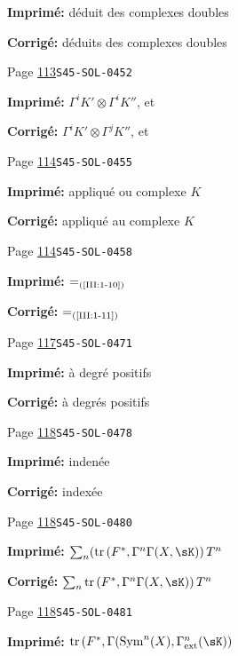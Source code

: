 \documentclass[oneside]{book}
\DeclareMathOperator{\tr}{tr}
\theoremstyle{sga-source}
\theoremstyle{sga-source-dash}
\theoremstyle{sga-source-dotdash}
\theoremstyle{sga-source-number-note-dash}
\theoremstyle{sga-source-note-number-dotdash}
\theoremstyle{sga-source-example-dotdash}
\theoremstyle{sga-source-inline-number}
\theoremstyle{sga-source-bare-number}
\theoremstyle{sga-source}
\begin{document}
\begin{description}
\par\noindent\textbf{Imprimé:} déduit des complexes doubles
\par\noindent\textbf{Corrigé:} déduits des complexes doubles
\smallskip
\item[\hypertarget{apparatus:FR-0070}{70}] Page \hyperlink{printpage:fr:113}{113}\quad\texttt{S45-SOL-0452}
\par\noindent\textbf{Imprimé:} $\Gamma^i K'\otimes \Gamma^i K''$, et
\par\noindent\textbf{Corrigé:} $\Gamma^i K'\otimes \Gamma^j K''$, et
\smallskip
\item[\hypertarget{apparatus:FR-0071}{71}] Page \hyperlink{printpage:fr:114}{114}\quad\texttt{S45-SOL-0455}
\par\noindent\textbf{Imprimé:} appliqué ou complexe $K$
\par\noindent\textbf{Corrigé:} appliqué au complexe $K$
\smallskip
\item[\hypertarget{apparatus:FR-0072}{72}] Page \hyperlink{printpage:fr:114}{114}\quad\texttt{S45-SOL-0458}
\par\noindent\textbf{Imprimé:} \(=_{\text{(\ref{III:1-10})}}\)
\par\noindent\textbf{Corrigé:} \(=_{\text{(\ref{III:1-11})}}\)
\smallskip
\item[\hypertarget{apparatus:FR-0073}{73}] Page \hyperlink{printpage:fr:117}{117}\quad\texttt{S45-SOL-0471}
\par\noindent\textbf{Imprimé:} à degré positifs
\par\noindent\textbf{Corrigé:} à degrés positifs
\smallskip
\item[\hypertarget{apparatus:FR-0074}{74}] Page \hyperlink{printpage:fr:118}{118}\quad\texttt{S45-SOL-0478}
\par\noindent\textbf{Imprimé:} indenée
\par\noindent\textbf{Corrigé:} indexée
\smallskip
\item[\hypertarget{apparatus:FR-0075}{75}] Page \hyperlink{printpage:fr:118}{118}\quad\texttt{S45-SOL-0480}
\par\noindent\textbf{Imprimé:} \(\sum_n (\tr\left(F^*,\Gamma^n \Gamma(X,\sK)\right) T^n\)
\par\noindent\textbf{Corrigé:} \(\sum_n \tr\left(F^*,\Gamma^n \Gamma(X,\sK)\right) T^n\)
\smallskip
\item[\hypertarget{apparatus:FR-0076}{76}] Page \hyperlink{printpage:fr:118}{118}\quad\texttt{S45-SOL-0481}
\par\noindent\textbf{Imprimé:} \(\tr\left(F^*,\Gamma(\operatorname{Sym}^n(X),\Gamma_\text{ext}^n(\sK)\right)\)

\end{description}
\end{document}
